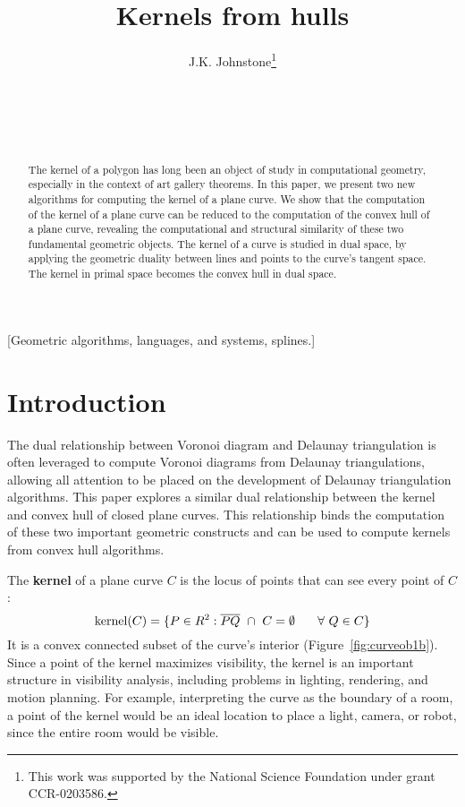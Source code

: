 \documentclass{sig-alternate}
\title{Kernels from hulls}
\author{
\alignauthor J.K. Johnstone\thanks{This work was supported by the National Science Foundation under grant CCR-0203586.}\\
\affaddr{Geometric Modeling Lab}\\
\affaddr{Computer and Information Sciences}\\
\affaddr{University of Alabama at Birmingham}\\
\affaddr{University Station, Birmingham, AL, USA 35294}\\
\email{jj@cis.uab.edu}
}
\newcommand{\seg}[1]{\mbox{$\overline{#1}$}}
\begin{document}
\maketitle

\begin{abstract}
The kernel of a polygon has long been an object of study in computational
geometry, especially in the context of art gallery theorems.
In this paper, we present two new algorithms for computing the kernel of a
plane curve.
We show that the computation of the kernel of a plane curve
can be reduced to the computation of the convex hull of a plane curve,
revealing the computational and structural similarity of these two fundamental
geometric objects.
The kernel of a curve is studied in dual space, by applying the 
geometric duality between lines and points to the curve's tangent space.
The kernel in primal space becomes the convex hull in dual space.
\end{abstract}

[Geometric algorithms, languages, and systems, splines.]


\section{Introduction}

The dual relationship between Voronoi diagram and Delaunay triangulation
\cite{preparata85} is often leveraged to compute Voro\-noi diagrams from 
Delaunay triangulations,
allowing all attention to be placed on the development of Delaunay triangulation
algorithms.
This paper explores a similar dual relationship between the kernel and convex hull
of closed plane curves.
This relationship binds the computation of these two important geometric constructs
and can be used to compute kernels from convex hull algorithms. 

The {\bf kernel} of a plane curve $C$ is the locus of points that can see every
point of $C$:
\[
\mbox{kernel}(C) = \{ P \in R^2: \seg{PQ} \ \cap \ C = \emptyset 
		\hspace{.25in} \forall \ Q \in C \}
\]
It is a convex connected subset of the curve's interior (Figure~\ref{fig:curveob1b}).
Since a point of the kernel maximizes visibility, the kernel 
is an important structure in visibility analysis,
including problems in lighting, rendering, and motion planning.
For example, interpreting the curve as the boundary of a room,
a point of the kernel would be an ideal location to place a light, camera, or robot,
since the entire room would be visible.
\end{document}
